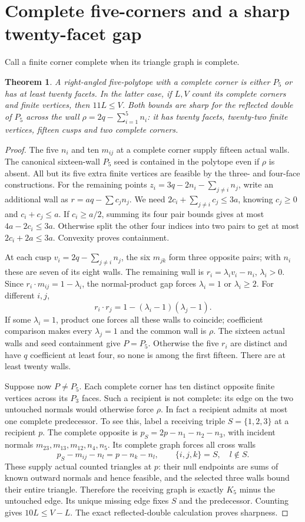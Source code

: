 \documentclass[11pt]{article}
\newtheorem{theorem}{Theorem}
\begin{document}
\section{Complete five-corners and a sharp twenty-facet gap}
Call a finite corner complete when its triangle graph is complete.
\begin{theorem}\label{thm:twenty}
A right-angled five-polytope with a complete corner is either $P_5$
or has at least twenty facets. In the latter case, if $L,V$ count its
complete corners and finite vertices, then $11L\le V$.
Both bounds are sharp for the reflected double of $P_5$ across the
wall $\rho=2q-\sum_{i=1}^5n_i$: it has twenty facets, twenty-two finite
vertices, fifteen cusps and two complete corners.
\end{theorem}
\begin{proof}
The five $n_i$ and ten $m_{ij}$ at a complete corner supply fifteen
actual walls. The canonical sixteen-wall $P_5$ seed is contained in
the polytope even if $\rho$ is absent. All but its five extra finite
vertices are feasible by the three- and four-face constructions.
For the remaining points $z_i=3q-2n_i-\sum_{j\ne i}n_j$, write an
additional wall as $r=a q-\sum c_j n_j$. We need
$2c_i+\sum_{j\ne i}c_j\le3a$, knowing $c_j\ge0$ and
$c_i+c_j\le a$. If $c_i\ge a/2$, summing its four pair bounds gives
at most $4a-2c_i\le3a$. Otherwise split the other four indices into
two pairs to get at most $2c_i+2a\le3a$. Convexity proves containment.

At each cusp $v_i=2q-\sum_{j\ne i}n_j$, the six $m_{jk}$ form three
opposite pairs; with $n_i$ these are seven of its eight walls.
The remaining wall is $r_i=\lambda_i v_i-n_i$, $\lambda_i>0$.
Since $r_i\cdot m_{ij}=1-\lambda_i$, the normal-product gap forces
$\lambda_i=1$ or $\lambda_i\ge2$.
For different $i,j$,
\[
 r_i\cdot r_j=1-(\lambda_i-1)(\lambda_j-1).
\]
If some $\lambda_i=1$, product one forces all these walls to coincide;
coefficient comparison makes every $\lambda_j=1$ and the common wall
is $\rho$. The sixteen actual walls and seed containment give $P=P_5$.
Otherwise the five $r_i$ are distinct and have $q$ coefficient at least
four, so none is among the first fifteen. There are at least twenty walls.

Suppose now $P\ne P_5$. Each complete corner has ten distinct opposite
finite vertices across its $P_3$ faces. Such a recipient is not complete:
its edge on the two untouched normals would otherwise force $\rho$.
In fact a recipient admits at most one complete predecessor.
To see this, label a receiving triple $S=\{1,2,3\}$ at a recipient $p$.
The complete opposite is $p_S=2p-n_1-n_2-n_3$, with incident normals
$m_{23},m_{13},m_{12},n_4,n_5$. Its complete graph forces all cross walls
\[
 p_S-m_{ij}-n_l=p-n_k-n_l,\qquad \{i,j,k\}=S,\quad l\notin S.
\]
These supply actual counted triangles at $p$: their null endpoints are
sums of known outward normals and hence feasible, and the selected
three walls bound their entire triangle. Therefore the receiving graph
is exactly $K_5$ minus the untouched edge. Its unique missing edge fixes
$S$ and the predecessor. Counting gives $10L\le V-L$.
The exact reflected-double calculation proves sharpness.
\end{proof}
\end{document}
